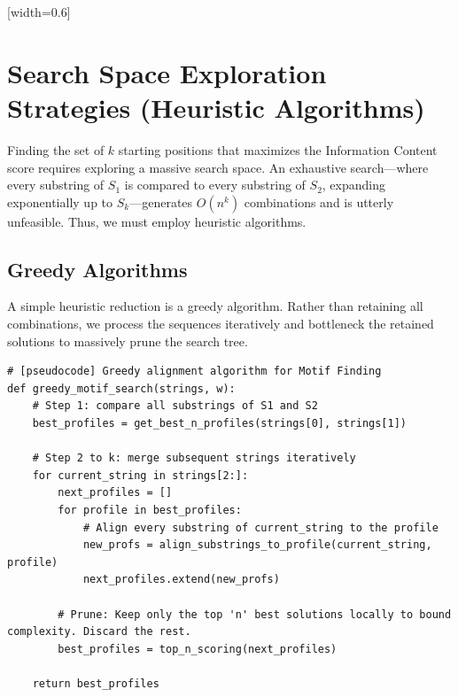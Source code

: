 [width=0.6\textwidth]

\section{Search Space Exploration Strategies (Heuristic Algorithms)}
Finding the set of $k$ starting positions that maximizes the Information Content score requires exploring a massive search space. An exhaustive search—where every substring of $S_1$ is compared to every substring of $S_2$, expanding exponentially up to $S_k$—generates $O(n^k)$ combinations and is utterly unfeasible. Thus, we must employ heuristic algorithms.

\subsection{Greedy Algorithms}
A simple heuristic reduction is a greedy algorithm. Rather than retaining all combinations, we process the sequences iteratively and bottleneck the retained solutions to massively prune the search tree.

\begin{verbatim}
# [pseudocode] Greedy alignment algorithm for Motif Finding
def greedy_motif_search(strings, w):
    # Step 1: compare all substrings of S1 and S2
    best_profiles = get_best_n_profiles(strings[0], strings[1]) 
    
    # Step 2 to k: merge subsequent strings iteratively
    for current_string in strings[2:]:
        next_profiles = []
        for profile in best_profiles:
            # Align every substring of current_string to the profile
            new_profs = align_substrings_to_profile(current_string, profile)
            next_profiles.extend(new_profs)
        
        # Prune: Keep only the top 'n' best solutions locally to bound complexity. Discard the rest.
        best_profiles = top_n_scoring(next_profiles) 
        
    return best_profiles
\end{verbatim}


